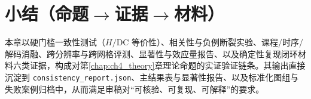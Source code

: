 \section{小结（命题\texorpdfstring{$\rightarrow$}{->}证据\texorpdfstring{$\rightarrow$}{->}材料）}
本章以硬门槛一致性测试（$H/\mathrm{DC}$ 等价性）、相关性与负例断裂实验、课程/时序/解码消融、跨分辨率与跨网格评测、显著性与效应量报告、以及确定性复现闭环材料六类证据，构成对第\ref{chap:ch4_theory}章理论命题的实证验证链条。其输出直接沉淀到 \texttt{consistency\_report.json}、主结果表与显著性报告、以及标准化图组与失败案例归档中，从而满足审稿对“可核验、可复现、可解释”的要求。

